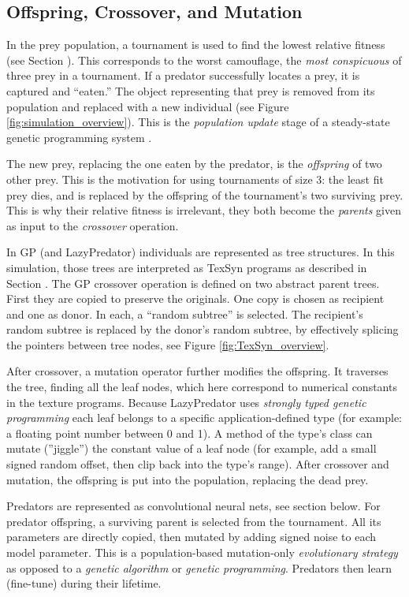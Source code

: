 \documentclass[letterpaper]{article}
\newcommand{\jargon}[1]{\textit{#1}}
\newcommand{\texsyn}[0]{TexSyn}
\newcommand{\lazypredator}[0]{LazyPredator}
\begin{document}
\subsection{Offspring, Crossover, and Mutation}
In the prey population, a tournament is used to find the lowest relative fitness (see Section ). This corresponds to the worst camouflage, the \jargon{most conspicuous} of three prey in a tournament. If a predator successfully locates a prey, it is captured and ``eaten.'' The object representing that prey is removed from its population and replaced with a new individual (see Figure \ref{fig:simulation_overview}). This is the \jargon{population update} stage of a steady-state genetic programming system \citep{syswerda_study_1991}.
\par
The new prey, replacing the one eaten by the predator, is the \jargon{offspring} of two other prey. This is the motivation for using tournaments of size 3: the least fit prey dies, and is replaced by the offspring of the tournament's two surviving prey. This is why their relative fitness is irrelevant, they both become the \jargon{parents} given as input to the \jargon{crossover} operation.
\par
In GP (and \lazypredator{}) individuals are represented as tree structures. In this simulation, those trees are interpreted as \texsyn{} programs as described in Section . The GP crossover operation is defined on two abstract parent trees. First they are copied to preserve the originals. One copy is chosen as recipient and one as donor. In each, a ``random subtree'' is selected. The recipient's random subtree is replaced by the donor's random subtree, by effectively splicing the pointers between tree nodes, see Figure \ref{fig:TexSyn_overview}.
\par
After crossover, a mutation operator further modifies the offspring. It traverses the tree, finding all the leaf nodes, which here correspond to numerical constants in the texture programs. Because \lazypredator{} uses \jargon{strongly typed genetic programming} \citep{montana_strongly_1995} each leaf belongs to a specific application-defined type (for example: a floating point number between 0 and 1). A method of the type's class can mutate (''jiggle'') the constant value of a leaf node (for example, add a small signed random offset, then clip back into the type's range). After crossover and mutation, the offspring is put into the population, replacing the dead prey.
\par
Predators are represented as convolutional neural nets, see section  below. For predator offspring, a surviving parent is selected from the tournament. All its parameters are directly copied, then mutated by adding signed noise to each model parameter. This is a population-based mutation-only \jargon{evolutionary strategy} as opposed to a \jargon{genetic algorithm} or \jargon{genetic programming}. Predators then learn (fine-tune) during their lifetime.
\par
\end{document}
